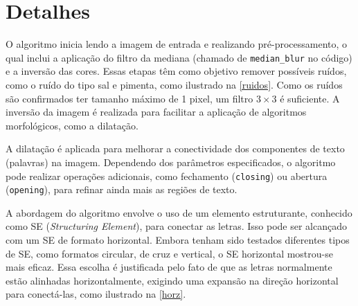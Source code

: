 \documentclass[english, 
               brazil, 
               bsc] %
               {dcomp-abntex2}
\begin{document}


\section{Detalhes} 


O algoritmo inicia lendo a imagem de entrada e realizando pré-processamento, o qual inclui a aplicação do filtro da mediana (chamado de \texttt{median\_blur} no código) e a inversão das cores. Essas etapas têm como objetivo remover possíveis ruídos, como o ruído do tipo sal e pimenta, como ilustrado na \autoref{ruidos}. Como os ruídos são confirmados ter tamanho máximo de 1 pixel, um filtro $3 \times 3$ é suficiente. A inversão da imagem é realizada para facilitar a aplicação de algoritmos morfológicos, como a dilatação.

A dilatação é aplicada para melhorar a conectividade dos componentes de texto (palavras) na imagem. Dependendo dos parâmetros especificados, o algoritmo pode realizar operações adicionais, como fechamento (\texttt{closing}) ou abertura (\texttt{opening}), para refinar ainda mais as regiões de texto.

A abordagem do algoritmo envolve o uso de um elemento estruturante, conhecido como SE (\textit{Structuring Element}), para conectar as letras. Isso pode ser alcançado com um SE de formato horizontal. Embora tenham sido testados diferentes tipos de SE, como formatos circular, de cruz e vertical, o SE horizontal mostrou-se mais eficaz. Essa escolha é justificada pelo fato de que as letras normalmente estão alinhadas horizontalmente, exigindo uma expansão na direção horizontal para conectá-las, como ilustrado na \autoref{horz}.

\end{document}
